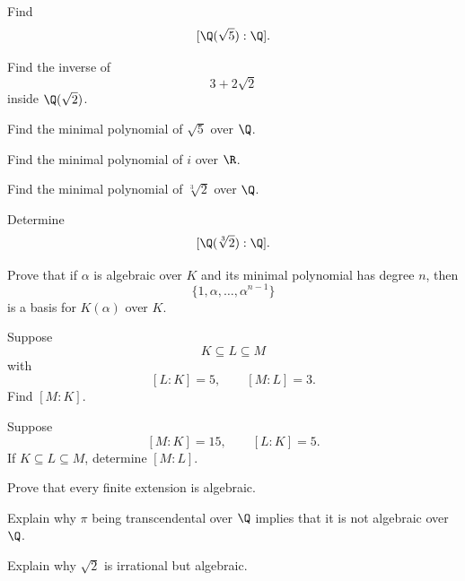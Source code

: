 \begin{exercise}[2]
Find
\[ [\Q(\sqrt5):\Q]. \]
\end{exercise}

\begin{exercise}[2]
Find the inverse of
\[ 3+2\sqrt2 \]
inside \(\Q(\sqrt2)\).
\end{exercise}

\begin{exercise}[2]
Find the minimal polynomial of \(\sqrt5\) over \(\Q\).
\end{exercise}

\begin{exercise}[2]
Find the minimal polynomial of \(i\) over \(\R\).
\end{exercise}

\begin{exercise}[2]
Find the minimal polynomial of \(\sqrt[3]{2}\) over \(\Q\).
\end{exercise}

\begin{exercise}[2]
Determine
\[ [\Q(\sqrt[3]{2}):\Q]. \]
\end{exercise}

\begin{exercise}[3]
Prove that if \(\alpha\) is algebraic over \(K\) and its minimal polynomial has
degree \(n\), then
\[ \{1,\alpha,\ldots,\alpha^{n-1}\} \]
is a basis for \(K(\alpha)\) over \(K\).
\end{exercise}

\begin{exercise}[2]
Suppose
\[ K\subseteq L\subseteq M \]
with
\[ [L:K]=5,\qquad[M:L]=3. \]
Find \([M:K]\).
\end{exercise}

\begin{exercise}[3]
Suppose
\[ [M:K]=15,\qquad[L:K]=5. \]
If \(K\subseteq L\subseteq M\), determine \([M:L]\).
\end{exercise}

\begin{exercise}[3]
Prove that every finite extension is algebraic.
\end{exercise}

\begin{exercise}[2]
Explain why \(\pi\) being transcendental over \(\Q\) implies that it is not
algebraic over \(\Q\).
\end{exercise}

\begin{exercise}[2]
Explain why \(\sqrt2\) is irrational but algebraic.
\end{exercise}

